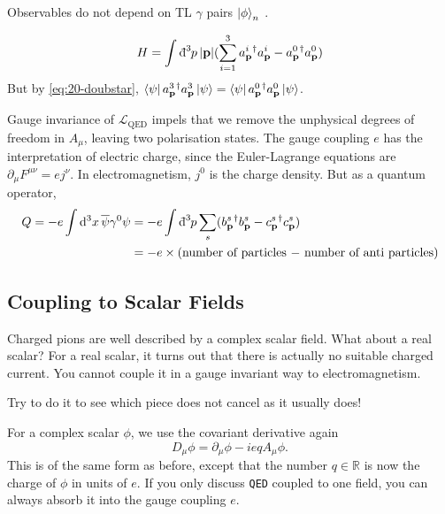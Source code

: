 Observables do not depend on TL $\gamma$ pairs $\ket{\phi}_n$ .
\begin{example}[]
  \begin{equation}
    H = \int \bdd[3]{p} \abs{\vb{p}} (\sum_{i=1}^{3} a_{\vb{p}}^{i}{}^{\dagger} a_{\vb{p}}^{i} - a_{\vb{p}}^0{}^{\dagger} a_{\vb{p}}^0)
  \end{equation}
  But by \eqref{eq:20-doubstar}, $\bra{\psi} a_{\vb{p}}^3{}^{\dagger} a_{\vb{p}}^3 \ket{\psi} = \bra{\psi} a_{\vb{p}}^0{}^{\dagger} a_{\vb{p}}^0 \ket{\psi}$.
\end{example}

Gauge invariance of $\mathcal{L}_{\text{QED}}$ impels that we remove the unphysical degrees of freedom in $A_{\mu}$, leaving two polarisation states.
The gauge coupling $e$  has the interpretation of electric charge, since the Euler-Lagrange equations are $\partial_{\mu} F^{\mu\nu} = e j^{\nu}$. In electromagnetism, $j^0$ is the charge density. But as a quantum operator,
 \begin{align}
   Q = -e \int \dd[3]{x} \overline{\psi} \gamma^0 \psi &= - e \int \bdd[3]{p} \sum_s (b_{\vb{p}}^s{}^{\dagger} b_{\vb{p}}^{s} - c_{\vb{p}}^{s}{}^{\dagger} c_{\vb{p}}^{s}) \\
						       &= - e \times (\text{number of particles $-$ number of anti particles})
\end{align} 

\subsection{Coupling to Scalar Fields}%
\label{sub:coupling_to_scalar}

Charged pions are well described by a complex scalar field.
What about a real scalar? For a real scalar, it turns out that there is actually no suitable charged current. You cannot couple it in a gauge invariant way to electromagnetism.
\begin{exercise}
  Try to do it to see which piece does not cancel as it usually does!
\end{exercise}
For a complex scalar $\phi$, we use the covariant derivative again
\begin{equation}
  D_{\mu} \phi = \partial_{\mu} \phi - i e q A_{\mu} \phi.
\end{equation}
This is of the same form as before, except that the number $q \in \mathbb{R}$  is now the charge of $\phi$ in units of $e$.
If you only discuss  \texttt{QED} coupled to one field, you can always absorb it into the gauge coupling $e$.

